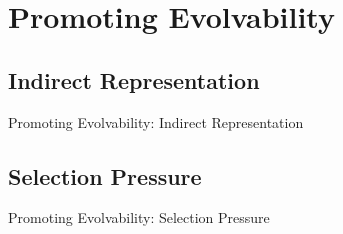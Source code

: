 \section{Promoting Evolvability}

\subsection{Indirect Representation}

\begin{frame}{Promoting Evolvability: Indirect Representation}
  
\end{frame}



\subsection{Selection Pressure}


\begin{frame}{Promoting Evolvability: Selection Pressure}
  
\end{frame}

